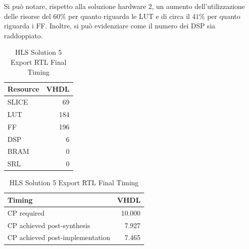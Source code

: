 Si può notare, rispetto alla soluzione hardware 2, un aumento dell'utilizzazione delle risorse del $60\%$ per quanto riguarda le LUT e di circa il $41\%$ per quanto riguarda i FF. Inoltre, si può evidenziare come il numero dei DSP sia raddoppiato.

\begin{table}[H]
	\centering
	\begin{minipage}[t]{0.45\linewidth}
		\centering
		\begin{tabular}{|l|r|}
			\hline
			\textbf{Resource} & \textbf{VHDL} \\
			\hline
			SLICE & 69 \\
			\hline
			LUT & 184 \\
			\hline
			FF & 196 \\
			\hline
			DSP & 6 \\
			\hline
			BRAM & 0 \\
			\hline
			SRL & 0 \\
			\hline
		\end{tabular}
		\caption{HLS Solution 5 Export RTL Resource Usage}
		\label{tab:hls-solution-5-export-rtl-resoruce-usage}
	\end{minipage}
	\hfill
	\begin{minipage}[t]{0.45\linewidth}
		\centering
		\begin{tabular}{|l|r|}
			\hline
			\textbf{Timing} & \textbf{VHDL} \\
			\hline
			CP required & 10.000 \\
			\hline
			CP achieved post-synthesis & 7.927 \\
			\hline
			CP achieved post-implementation & 7.465 \\
			\hline
		\end{tabular}
		\caption{HLS Solution 5 Export RTL Final Timing}
		\label{tab:hls-solution-5-export-rtl-final-timing}
	\end{minipage}
\end{table}
